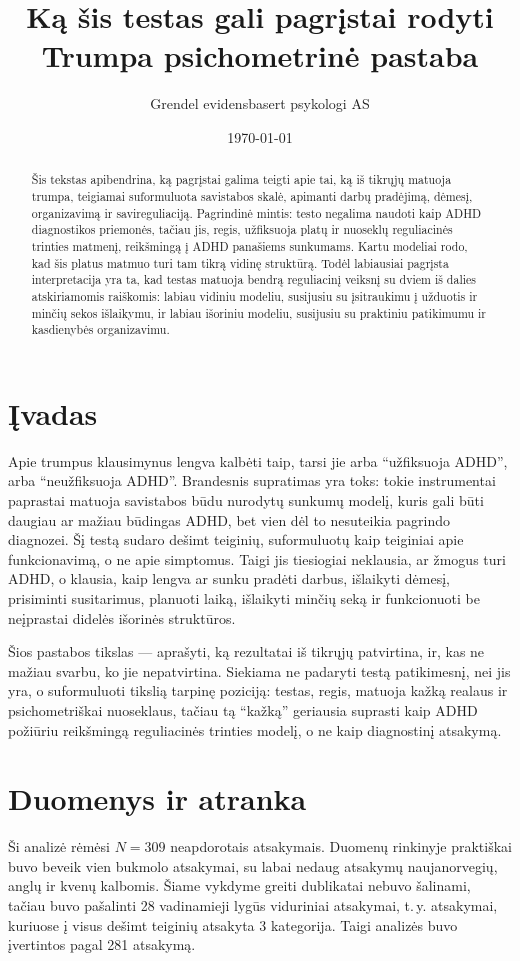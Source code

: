 \documentclass[11pt,a4paper]{article}
\title{Ką šis testas gali pagrįstai rodyti\\
\large Trumpa psichometrinė pastaba}
\author{Grendel evidensbasert psykologi AS}
\date{\today}
\begin{document}
\maketitle

\begin{abstract}
Šis tekstas apibendrina, ką pagrįstai galima teigti apie tai, ką iš tikrųjų matuoja trumpa, teigiamai suformuluota savistabos skalė, apimanti darbų pradėjimą, dėmesį, organizavimą ir savireguliaciją. Pagrindinė mintis: testo negalima naudoti kaip ADHD diagnostikos priemonės, tačiau jis, regis, užfiksuoja platų ir nuoseklų reguliacinės trinties matmenį, reikšmingą į ADHD panašiems sunkumams. Kartu modeliai rodo, kad šis platus matmuo turi tam tikrą vidinę struktūrą. Todėl labiausiai pagrįsta interpretacija yra ta, kad testas matuoja bendrą reguliacinį veiksnį su dviem iš dalies atskiriamomis raiškomis: labiau vidiniu modeliu, susijusiu su įsitraukimu į užduotis ir minčių sekos išlaikymu, ir labiau išoriniu modeliu, susijusiu su praktiniu patikimumu ir kasdienybės organizavimu.
\end{abstract}

\section{Įvadas}
Apie trumpus klausimynus lengva kalbėti taip, tarsi jie arba ``užfiksuoja ADHD'', arba ``neužfiksuoja ADHD''. Brandesnis supratimas yra toks: tokie instrumentai paprastai matuoja savistabos būdu nurodytų sunkumų modelį, kuris gali būti daugiau ar mažiau būdingas ADHD, bet vien dėl to nesuteikia pagrindo diagnozei. Šį testą sudaro dešimt teiginių, suformuluotų kaip teiginiai apie funkcionavimą, o ne apie simptomus. Taigi jis tiesiogiai neklausia, ar žmogus turi ADHD, o klausia, kaip lengva ar sunku pradėti darbus, išlaikyti dėmesį, prisiminti susitarimus, planuoti laiką, išlaikyti minčių seką ir funkcionuoti be neįprastai didelės išorinės struktūros.

Šios pastabos tikslas — aprašyti, ką rezultatai iš tikrųjų patvirtina, ir, kas ne mažiau svarbu, ko jie nepatvirtina. Siekiama ne padaryti testą patikimesnį, nei jis yra, o suformuluoti tikslią tarpinę poziciją: testas, regis, matuoja kažką realaus ir psichometriškai nuoseklaus, tačiau tą ``kažką'' geriausia suprasti kaip ADHD požiūriu reikšmingą reguliacinės trinties modelį, o ne kaip diagnostinį atsakymą.

\section{Duomenys ir atranka}
Ši analizė rėmėsi $N = 309$ neapdorotais atsakymais. Duomenų rinkinyje praktiškai buvo beveik vien bukmolo atsakymai, su labai nedaug atsakymų naujanorvegių, anglų ir kvenų kalbomis. Šiame vykdyme greiti dublikatai nebuvo šalinami, tačiau buvo pašalinti 28 vadinamieji lygūs viduriniai atsakymai, t.\,y. atsakymai, kuriuose į visus dešimt teiginių atsakyta 3 kategorija. Taigi analizės buvo įvertintos pagal 281 atsakymą.
\end{document}
